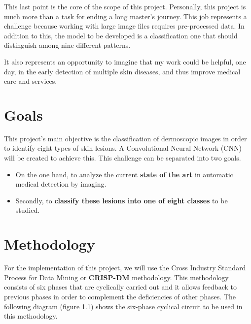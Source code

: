 This last point is the core of the scope of this project. Personally, this project is much more than a task for ending a long master's journey. This job represents a challenge because working with large image files requires pre-processed data. In addition to this, the model to be developed is a classification one that should distinguish among nine different patterns.

It also represents an opportunity to imagine that my work could be helpful, one day, in the early detection of multiple skin diseases, and thus improve medical care and services.



\section{Goals}


This project's main objective is the classification of dermoscopic images in order to identify eight types of skin lesions. A Convolutional Neural Network (CNN) will be created to achieve this. This challenge can be separated into two goals.

\begin{itemize}
    \item On the one hand, to analyze the current \textbf{state of the art} in automatic medical detection by imaging.
    \item Secondly, to \textbf{classify these lesions into one of eight classes} to be studied.
\end{itemize}

\section{Methodology}


For the implementation of this project, we will use the Cross Industry Standard Process for Data Mining or \textbf{CRISP-DM} methodology. This methodology consists of six phases that are cyclically carried out and it allows feedback to previous phases in order to complement the deficiencies of other phases. The following diagram (figure 1.1) shows the six-phase cyclical circuit to be used in this methodology.

